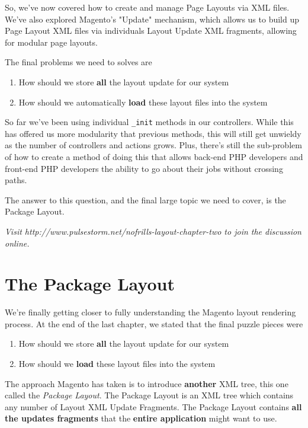 \documentclass[oneside]{book}
\begin{document}
So, we've now covered how to create and manage Page Layouts via XML files.  We've also explored Magento's "Update" mechanism, which allows us to build up Page Layout XML files via individuals Layout Update XML fragments, allowing for modular page layouts.

The final problems we need to solves are

\begin{enumerate}
\item How should we store \textbf{all} the layout update for our system
\item How should we automatically \textbf{load} these layout files into the system
\end{enumerate}


So far we've been using individual \footnotesize\texttt{\_init} \normalsize  methods in our controllers.  While this has offered us more modularity that previous methods, this will still get unwieldy as the number of controllers and actions grows.  Plus, there's still the sub-problem of how to create a method of doing this that allows back-end PHP developers and front-end PHP developers the ability to go about their jobs without crossing paths.

The answer to this question, and the final large topic we need to cover, is the Package Layout.

\emph{Visit http://www.pulsestorm.net/nofrills-layout-chapter-two to join the discussion online.}
\chapter{The Package Layout}
We're finally getting closer to fully understanding the Magento layout rendering process.  At the end of the last chapter, we stated that the final puzzle pieces were

\begin{enumerate}
\item How should we store \textbf{all} the layout update for our system
\item How should we \textbf{load} these layout files into the system
\end{enumerate}


The approach Magento has taken is to introduce \textbf{another} XML tree, this one called the \emph{Package Layout}.  The Package Layout is an XML tree which contains any number of Layout XML Update Fragments. The Package Layout contains \textbf{all the updates fragments} that the \textbf{entire application} might want to use.
\end{document}

